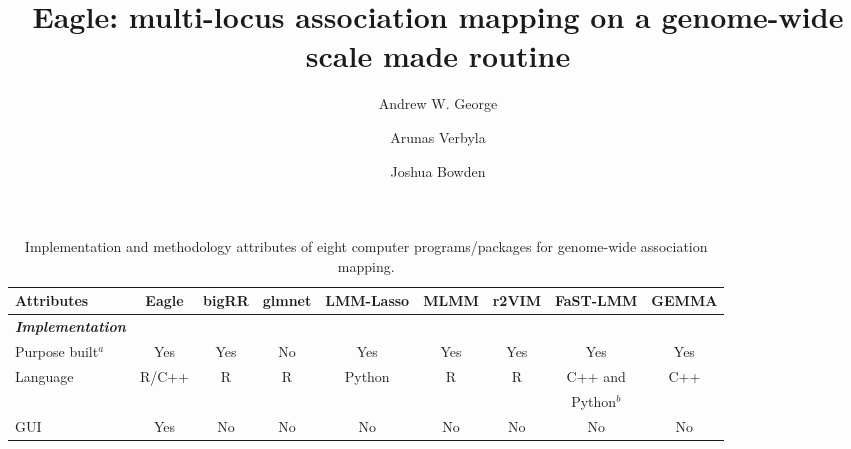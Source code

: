 \documentclass{article}
\begin{document}
\title{Eagle: multi-locus association mapping on a genome-wide scale made routine}
\author[1]{Andrew W. George}
\author[2]{Arunas Verbyla}
\author[3]{Joshua Bowden}
\date{}



\maketitle







\begin{landscape}

\begin{table}
\caption{Implementation and methodology attributes of eight computer programs/packages for genome-wide association mapping.  }
\label{suptabsummary}
\vspace{0.5cm}
\begin{tabular}{lcccccccc} \hline
                                                   Attributes                  & {\bf Eagle}                                 & {\bf bigRR}             & {\bf glmnet}            & {\bf LMM-Lasso}                    & {\bf MLMM} & {\bf r2VIM}      & {\bf FaST-LMM} & {\bf GEMMA} \\  \hline
{\bf {\em Implementation}}    &         &            &             &                   &            &                &      &      \\ [0.15cm]
\hspace{1mm}  Purpose built$^a$    &   Yes     &    Yes      &  No   &   Yes  &  Yes  &  Yes  & Yes  & Yes          \\ [0.15cm]


\hspace{1mm}  Language                 &  R/C++       &    R        &      R       &     Python     &  R          &    R         &  C++ and     &   C++   \\  
                                                          &         &            &             &                   &            &                                     &   Python$^b$       &      \\  [0.15cm]

\hspace{1mm} GUI                            & Yes &    No      & No          &  No    &  No    &   No     & No     & No    \\  [0.15cm]





\end{tabular}
\end{table}
\end{landscape}
\end{document}
